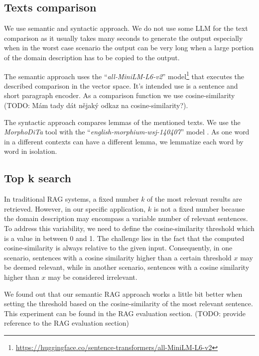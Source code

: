 \subsection{Texts comparison}

We use semantic and syntactic approach. We do not use some LLM for the text comparison as it usually takes many seconds to generate the output especially when in the worst case scenario the output can be very long when a large portion of the domain description has to be copied to the output.

The semantic approach uses the ``\textit{all-MiniLM-L6-v2}'' model\footnote{\url{https://huggingface.co/sentence-transformers/all-MiniLM-L6-v2}} that executes the described comparison in the vector space. It's intended use is a sentence and short paragraph encoder. As a comparison function we use cosine-similarity (TODO: Mám tady dát nějaký odkaz na cosine-similarity?).

The syntactic approach compares lemmas of the mentioned texts. We use the \textit{MorphoDiTa} tool \cite{Strakova2014} with the ``\textit{english-morphium-wsj-140407}'' model \cite{Straka2014}. As one word in a different contexts can have a different lemma, we lemmatize each word by word in isolation.


\subsection{Top k search}

In traditional RAG systems, a fixed number $k$ of the most relevant results are retrieved. However, in our specific application, $k$ is not a fixed number because the domain description may encompass a variable number of relevant sentences. To address this variability, we need to define the cosine-similarity threshold which is a value in between 0 and 1. The challenge lies in the fact that the computed cosine-similarity is always relative to the given input. Consequently, in one scenario, sentences with a cosine similarity higher than a certain threshold $x$ may be deemed relevant, while in another scenario, sentences with a cosine similarity higher than $x$ may be considered irrelevant.

We found out that our semantic RAG approach works a little bit better when setting the threshold based on the cosine-similarity of the most relevant sentence. This experiment can be found in the RAG evaluation section. (TODO: provide reference to the RAG evaluation section)


